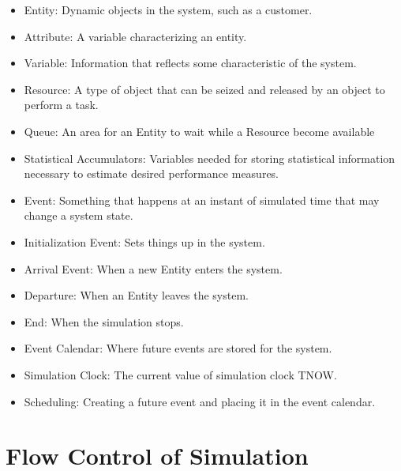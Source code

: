 \documentclass[12pt]{article}
\begin{document}
\begin{itemize}
\item Entity: Dynamic objects in the system, such as a customer. 

\item Attribute: A variable characterizing an entity. 

\item Variable: Information that reflects some characteristic of the system. 

\item Resource: A type of object that can be seized and released by an object to perform a task.

\item Queue: An area for an Entity to wait while a Resource become available

\item Statistical Accumulators: Variables needed for storing statistical information necessary to estimate desired performance measures. 

\item Event: Something that happens at an instant of simulated time that may change a system state. 

\item Initialization Event: Sets things up in the system.

\item Arrival Event: When a new Entity enters the system.

\item Departure: When an Entity leaves the system.

\item End: When the simulation stops.

\item Event Calendar: Where future events are stored for the system. 

\item Simulation Clock: The current value of simulation clock TNOW.

\item Scheduling: Creating a future event and placing it in the event calendar. 

\end{itemize}

\section*{Flow Control of Simulation}
\end{document}
